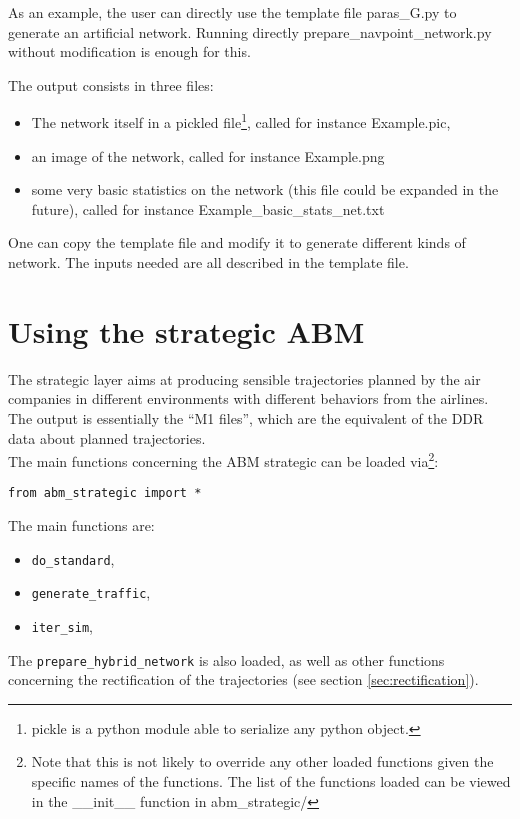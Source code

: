 \documentclass[12pt]{article}
\begin{document}
As an example, the user can directly use the template file paras\_G.py to generate an artificial network. Running directly prepare\_navpoint\_network.py without modification is enough for this.

The output consists in three files: 
\begin{itemize}
\item The network itself in a pickled file\footnote{pickle is a python module able to serialize any python object.}, called for instance Example.pic,
\item an image of the network, called for instance Example.png
\item some very basic statistics on the network (this file could be expanded in the future), called for instance Example\_basic\_stats\_net.txt
\end{itemize}

One can copy the template file and modify it to generate different kinds of network. The inputs needed are all described in the template file.

\section{Using the strategic ABM}
The strategic layer aims at producing sensible trajectories planned by the air companies in different environments with different behaviors from the airlines. The output is essentially the ``M1 files'', which are the equivalent of the DDR data about planned trajectories.
\\

The main functions concerning the ABM strategic can be loaded via\footnote{Note that this is not likely to override any other loaded functions given the specific names of the functions. The list of the functions loaded can be viewed in the \_\_init\_\_ function in abm\_strategic/}:
\begin{verbatim}
from abm_strategic import *
\end{verbatim}

The main functions are:
\begin{itemize}
\item \verb|do_standard|,
\item \verb|generate_traffic|,
\item \verb|iter_sim|,
\end{itemize}

The \verb|prepare_hybrid_network| is also loaded, as well as other functions concerning the rectification of the trajectories (see section \ref{sec:rectification}).
\end{document}
